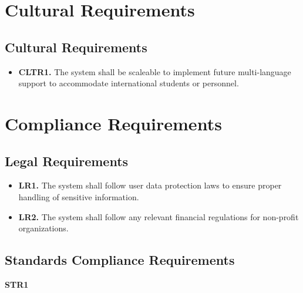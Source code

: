 \documentclass[12pt]{article}
\begin{document}
\section{Cultural Requirements}
\subsection{Cultural Requirements}

\label{CLTR}

\begin{itemize}
    \item \textbf{CLTR1.} The system shall be scaleable to implement future multi-language support to accommodate international students or personnel.
\end{itemize}

\section{Compliance Requirements}
\subsection{Legal Requirements}

\label{LR}

\begin{itemize}
    \item \textbf{LR1.} The system shall follow user data protection laws to ensure proper handling of sensitive information.
    \item \textbf{LR2.} The system shall follow any relevant financial regulations for non-profit organizations.
\end{itemize}
\subsection{Standards Compliance Requirements}

\label{STR}
\textbf{STR1}
\end{document}
